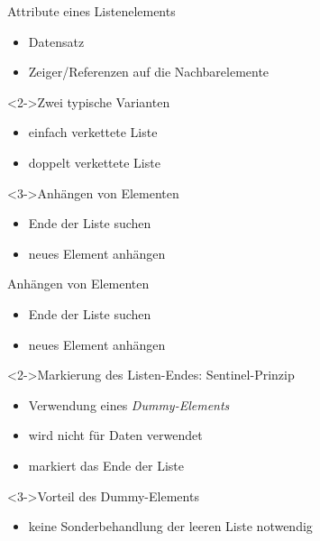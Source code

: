 \begin{frame}
    \begin{block}{Attribute eines Listenelements}
        \begin{itemize}
            \item Datensatz
            \item Zeiger/Referenzen auf die Nachbarelemente
        \end{itemize}
    \end{block}
    \begin{block}<2->{Zwei typische Varianten}
        \begin{itemize}
            \item einfach verkettete Liste
            \item doppelt verkettete Liste
        \end{itemize}
    \end{block}
    \begin{block}<3->{Anhängen von Elementen}
        \begin{itemize}
            \item Ende der Liste suchen
            \item neues Element anhängen
        \end{itemize}
    \end{block}
\end{frame}

\begin{frame}
    \begin{block}{Anhängen von Elementen}
        \begin{itemize}
            \item Ende der Liste suchen
            \item neues Element anhängen
        \end{itemize}
    \end{block}
    \begin{block}<2->{Markierung des Listen-Endes: \alert{Sentinel-Prinzip}}
        \begin{itemize}
            \item Verwendung eines \emph{Dummy-Elements}
            \item wird nicht für Daten verwendet
            \item markiert das Ende der Liste
        \end{itemize}
    \end{block}
    \begin{block}<3->{Vorteil des Dummy-Elements}
        \begin{itemize}
            \item keine Sonderbehandlung der leeren Liste notwendig
        \end{itemize}
    \end{block}
\end{frame}

